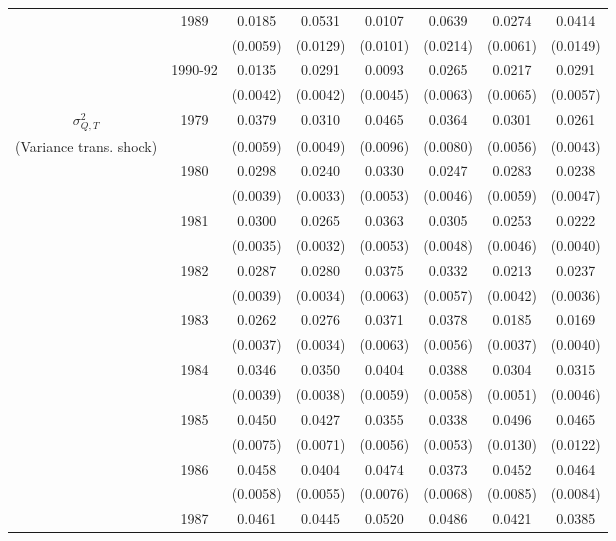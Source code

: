 \begin{table}
\begin{center}
{\begin{tabular}{cccc|cc|cc}
				\\  & 1989 & 0.0185 &   0.0531 & 0.0107 &   0.0639 & 0.0274 &   0.0414 
				\\  &                    & (0.0059) & (0.0129)  & (0.0101) & (0.0214)  & (0.0061) & (0.0149) 
				\\  & 1990-92 & 0.0135 &   0.0291 & 0.0093 &   0.0265 & 0.0217 &   0.0291 
				\\  &         & (0.0042) & (0.0042) & (0.0045) & (0.0063) & (0.0065) & (0.0057) 
				\\ \hline  
				$\sigma^2_{Q,T}$ & 1979      & 0.0379 &   0.0310 & 0.0465 &   0.0364 & 0.0301 &   0.0261 
				\\ (Variance trans. shock) &     & (0.0059) & (0.0049) & (0.0096) & (0.0080) & (0.0056) & (0.0043) 
				\\  & 1980 & 0.0298 &   0.0240 & 0.0330 &   0.0247 & 0.0283 &   0.0238
				\\  &                    & (0.0039) & (0.0033)  & (0.0053) & (0.0046)  & (0.0059) & (0.0047) 
				\\  & 1981 & 0.0300 &   0.0265 & 0.0363 &   0.0305 & 0.0253 &   0.0222
				\\  &                    & (0.0035) & (0.0032)  & (0.0053) & (0.0048)  & (0.0046) & (0.0040) 
				\\  & 1982 & 0.0287 &   0.0280 & 0.0375 &   0.0332 & 0.0213 &   0.0237
				\\  &                    & (0.0039) & (0.0034)  & (0.0063) & (0.0057)  & (0.0042) & (0.0036) 
				\\  & 1983 & 0.0262 &   0.0276 & 0.0371 &   0.0378 & 0.0185 &   0.0169
				\\  &                    & (0.0037) & (0.0034)  & (0.0063) & (0.0056)  & (0.0037) & (0.0040) 
				\\  & 1984 & 0.0346 &   0.0350 & 0.0404 &   0.0388 & 0.0304 &   0.0315
				\\  &                    & (0.0039) & (0.0038)  & (0.0059) & (0.0058)  & (0.0051) & (0.0046) 
				\\  & 1985 & 0.0450 &   0.0427 & 0.0355 &   0.0338 & 0.0496 &   0.0465
				\\  &                    & (0.0075) & (0.0071)  & (0.0056) & (0.0053)  & (0.0130) & (0.0122) 
				\\  & 1986 & 0.0458 &   0.0404 & 0.0474 &   0.0373 & 0.0452 &   0.0464
				\\  &                    & (0.0058) & (0.0055)  & (0.0076) & (0.0068)  & (0.0085) & (0.0084) 
				\\  & 1987 & 0.0461 &   0.0445 & 0.0520 &   0.0486 & 0.0421 &   0.0385

\end{tabular}}
\end{center}
\end{table}

